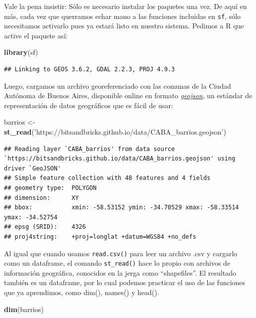 \documentclass[]{book}
\newenvironment{Shaded}{\begin{snugshade}}{\end{snugshade}}
\newcommand{\KeywordTok}[1]{\textcolor[rgb]{0.13,0.29,0.53}{\textbf{#1}}}
\newcommand{\StringTok}[1]{\textcolor[rgb]{0.31,0.60,0.02}{#1}}
\newcommand{\NormalTok}[1]{#1}
\begin{document}
Vale la pena insistir: Sólo es necesario instalar los paquetes una vez.
De aquí en más, cada vez que querramos echar mano a las funciones
incluidas en \texttt{sf}, sólo necesitamos activarlo pues ya estará
listo en nuestro sistema. Pedimos a R que active el paquete así:

\begin{Shaded}
\begin{Highlighting}[]
\KeywordTok{library}\NormalTok{(sf)}
\end{Highlighting}
\end{Shaded}

\begin{verbatim}
## Linking to GEOS 3.6.2, GDAL 2.2.3, PROJ 4.9.3
\end{verbatim}

Luego, cargamos un archivo georeferenciado con las comunas de la Ciudad
Autónoma de Buenos Aires, disponible online en formato
\href{https://es.wikipedia.org/wiki/GeoJSON}{\emph{geojson}}, un
estándar de representación de datos geográficos que es fácil de usar:

\begin{Shaded}
\begin{Highlighting}[]
\NormalTok{barrios <-}\StringTok{ }\KeywordTok{st_read}\NormalTok{(}\StringTok{'https://bitsandbricks.github.io/data/CABA_barrios.geojson'}\NormalTok{)}
\end{Highlighting}
\end{Shaded}

\begin{verbatim}
## Reading layer `CABA_barrios' from data source `https://bitsandbricks.github.io/data/CABA_barrios.geojson' using driver `GeoJSON'
## Simple feature collection with 48 features and 4 fields
## geometry type:  POLYGON
## dimension:      XY
## bbox:           xmin: -58.53152 ymin: -34.70529 xmax: -58.33514 ymax: -34.52754
## epsg (SRID):    4326
## proj4string:    +proj=longlat +datum=WGS84 +no_defs
\end{verbatim}

Al igual que cuando usamos \texttt{read.csv()} para leer un archivo .csv
y cargarlo como un dataframe, el comando \texttt{st\_read()} hace lo
propio con archivos de información geográfica, conocidos en la jerga
como ``shapefiles''. El resultado también es un dataframe, por lo cual
podemos practicar el uso de las funciones que ya aprendimos, como dim(),
names() y head().

\begin{Shaded}
\begin{Highlighting}[]
\KeywordTok{dim}\NormalTok{(barrios)}
\end{Highlighting}
\end{Shaded}
\end{document}
